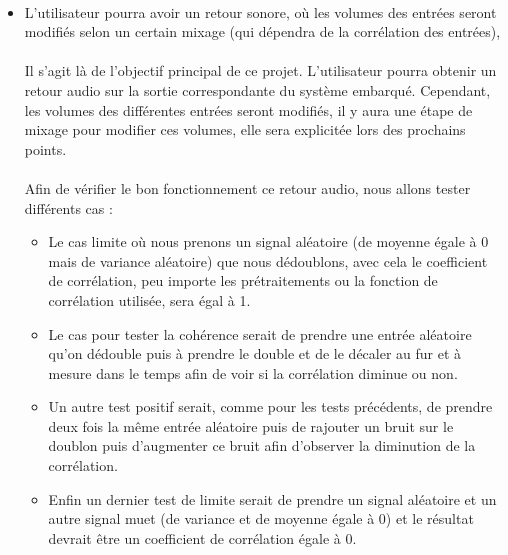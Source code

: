 \documentclass{article}
\begin{document}
\paragraph{}
\begin{itemize}
	\item L'utilisateur pourra avoir un retour sonore, où les volumes des
	      entrées seront modifiés selon un certain mixage (qui dépendra de la
	      corrélation des entrées),
	      \paragraph{}
	      Il s'agit là de l'objectif principal de ce projet. L'utilisateur pourra
	      obtenir un retour audio sur la sortie correspondante du système embarqué.
	      Cependant, les volumes des différentes entrées seront modifiés, il y
	      aura une étape de mixage pour modifier ces volumes, elle sera explicitée
	      lors des prochains points.
	      \paragraph{}
	      Afin de vérifier le bon fonctionnement ce retour audio, nous allons tester
	      différents cas :
	      \begin{itemize}
	      	\item Le cas limite où nous prenons un signal aléatoire (de moyenne égale à 0 mais de variance aléatoire)
	      	      que nous dédoublons, avec
	      	      cela le coefficient de corrélation, peu importe les prétraitements ou la fonction de
	      	      corrélation utilisée, sera égal à 1.
	      	\item Le cas pour tester la cohérence serait de prendre une entrée aléatoire
	      	      qu'on dédouble puis à prendre le double et de le décaler au fur et à mesure dans le temps
	      	      afin de voir si la corrélation diminue ou non.
	      	\item Un autre test positif serait, comme pour les tests précédents, de prendre deux fois la même
	      	      entrée aléatoire puis de rajouter un bruit sur le doublon puis d'augmenter
	      	      ce bruit afin d'observer la diminution de la corrélation.
	      	\item Enfin un dernier test de limite serait de prendre un signal aléatoire
	      	      et un autre signal muet (de variance et de moyenne égale à 0) et le résultat
	      	      devrait être un coefficient de corrélation égale à 0.
	      \end{itemize}



\end{itemize}
\end{document}
